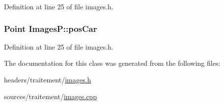 Definition at line 25 of file images.\-h.

\hypertarget{class_images_p_a79d1d01bae703caeee1033425e4f8f18}{
\subsubsection[{pos\-Car}]{\setlength{\rightskip}{0pt plus 5cm}Point Images\-P\-::pos\-Car}}\label{class_images_p_a79d1d01bae703caeee1033425e4f8f18}


Definition at line 25 of file images.\-h.



The documentation for this class was generated from the following files\-:\begin{DoxyCompactItemize}
\item 
headers/traitement/\hyperlink{images_8h}{images.\-h}\item 
sources/traitement/\hyperlink{images_8cpp}{images.\-cpp}\end{DoxyCompactItemize}
